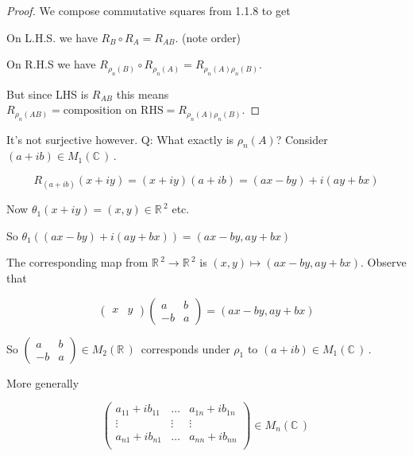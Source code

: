 \documentclass[12pt,a4paper]{article}
\newcommand{\rR}{\ensuremath{\mathbb{R}\,}}
\newcommand{\cC}{\ensuremath{\mathbb{C}\,}}
\newcommand{\mnc}{\ensuremath{M_n(\cC)\,}}
\newcommand{\mr}[1]{\ensuremath{M_{#1}(\rR)\,}}
\newcommand{\mc}[1]{\ensuremath{M_{#1}(\cC)\,}}
\begin{document}
\begin{proof}
We compose commutative squares from 1.1.8 to get

\begin{center}
\end{center}

On L.H.S. we have $R_B \circ R_A = R_{AB}$. (note order)

On R.H.S we have $R_{\rho_n(B)} \circ R_{\rho_n(A)} =R_{\rho_n(A)\rho_n(B)}$.

But since LHS is $R_{AB}$ this means $R_{\rho_n(AB)}= \text{composition on RHS}=R_{\rho_n(A)\rho_n(B)}$.
\end{proof}

It's not surjective however. Q: What exactly is $\rho_n(A)$? Consider $(a+ib)\in \mc{1}$. 

\[R_{(a+ib)}(x+iy)=(x+iy)(a+ib)=(ax-by)+i(ay+bx)\]

Now $\theta_1(x+iy)=(x,y) \in \rR^2$ etc.

So $\theta_1((ax-by)+i(ay+bx))=(ax-by,ay+bx)$

The corresponding map from $\rR ^2\to \rR^2$ is $(x,y)\mapsto (ax-by,ay+bx)$. Observe that 

\[\begin{pmatrix} x & y\end{pmatrix}\begin{pmatrix} a & b \\ -b & a \end{pmatrix}=(ax-by,ay+bx)\]

So $\begin{pmatrix} a & b \\ -b & a \end{pmatrix}\in \mr{2}$ corresponds under $\rho_1$ to $(a+ib)\in \mc{1}$.

More generally 

\[\begin{pmatrix}
  a_{11}+ib_{11} & \ldots &   a_{1n}+ib_{1n}\\
  \vdots & \vdots & \vdots \\
   a_{n1}+ib_{n1} & \ldots &   a_{nn}+ib_{nn}\\
\end{pmatrix} \in \mnc\]
\end{document}
